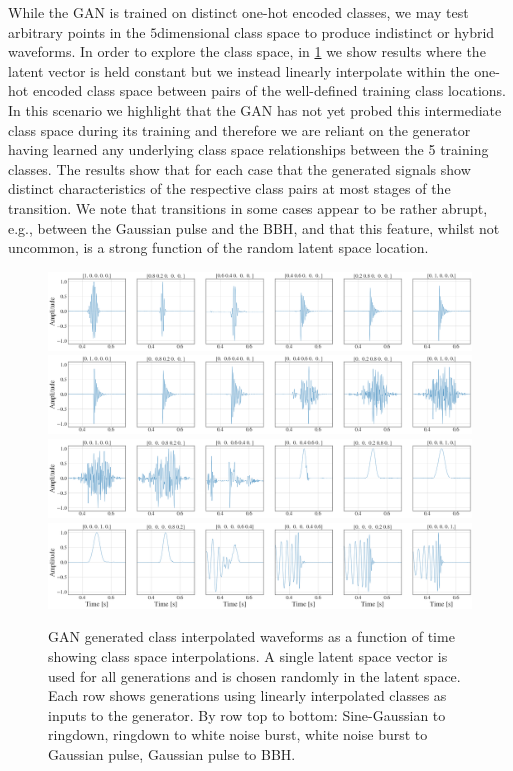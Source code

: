 \documentclass[12pt]{iopart}
\newcommand{\ndimensional}[1]{$#1$\nobreakdash\discretionary{-}{-}{-}dimensional}
\begin{document}
While the \ac{GAN} is trained on distinct one-hot encoded classes, we may test arbitrary points in the \ndimensional{5} class space to produce indistinct or hybrid waveforms. In order to explore the class space, in \cref{fig:c_interp} we show results where the latent vector is held constant but we instead linearly
interpolate within the one-hot encoded class space between pairs of the well-defined training class locations. In this scenario we highlight that the \ac{GAN} has not yet probed this intermediate class space during its training and therefore we are reliant on the generator having learned any underlying class space relationships between the 5 training classes. The results show that for each case that the generated signals show distinct characteristics of the respective class pairs at most stages of the transition. We note that transitions in some cases appear to be rather abrupt, e.g., between the Gaussian pulse and the \ac{BBH}, and that this feature, whilst not uncommon, is a strong function of the random latent space location. 
%
\begin{figure}[!h]
    \centering
    \includegraphics[width=\textwidth]{figures/generations/sg-rd.png}
    \includegraphics[width=\textwidth]{figures/generations/rd-wnb.png}
    \includegraphics[width=\textwidth]{figures/generations/wnb-blip.png}
    \includegraphics[width=\textwidth]{figures/generations/blip-bbh.png}
    \caption{\ac{GAN} generated class interpolated waveforms as a function of time showing class space interpolations. A single latent space vector is used for all generations and is chosen randomly in the latent space. Each row shows generations using linearly interpolated classes as inputs to the generator. By row top to bottom: Sine-Gaussian to ringdown, ringdown to white noise burst, white noise burst to Gaussian pulse, Gaussian pulse to BBH.}
    \label{fig:c_interp}
\end{figure}
%
\end{document}
